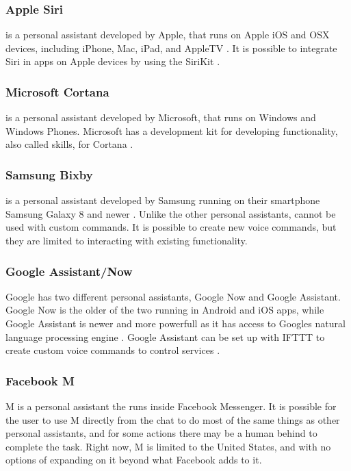 \subsubsection{Apple Siri}
\siri is a personal assistant developed by Apple, that runs on Apple iOS and OSX devices, including iPhone, Mac, iPad, and AppleTV \cite{AppleSiri}. It is possible to integrate Siri in apps on Apple devices by using the SiriKit \cite{AppleSiri:Sirikit}.

\subsubsection{Microsoft Cortana}
\cortana is a personal assistant developed by Microsoft, that runs on Windows and Windows Phones\cite{MicrosoftCortana}. Microsoft has a development kit for developing functionality, also called skills, for Cortana \cite{MicrosoftCortana:SetUpCommands}.

\subsubsection{Samsung Bixby}
\bixby is a personal assistant developed by Samsung running on their smartphone Samsung Galaxy 8 and newer \cite{SamsungBixby}. Unlike the other personal assistants, \bixby cannot be used with custom commands. It is possible to create new voice commands, but they are limited to interacting with existing functionality.

\subsubsection{Google Assistant/Now}
Google has two different personal assistants, Google Now and Google Assistant. Google Now is the older of the two running in Android and iOS apps, while Google Assistant is newer and more powerfull as it has access to Googles natural language processing engine \cite{GoogleNowAssistant}. Google Assistant can be set up with IFTTT to create custom voice commands to control services \cite{GoogleNowassistant:IFTTT}.  

\subsubsection{Facebook M}
M is a personal assistant the runs inside Facebook Messenger. It is possible for the user to use M directly from the chat to do most of the same things as other personal assistants, and for some actions there may be a human behind to complete the task. Right now, M is limited to the United States, and with no options of expanding on it beyond what Facebook adds to it\cite{FacebookM}.

